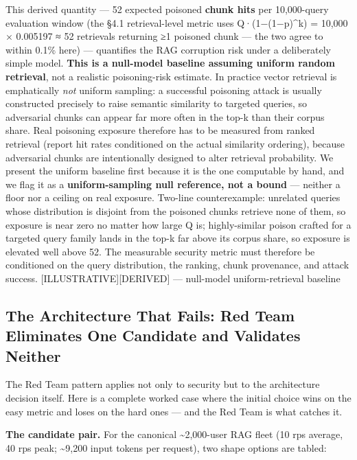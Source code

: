 This derived quantity --- 52 expected poisoned \textbf{chunk hits} per
10,000-query evaluation window (the §4.1 retrieval-level metric uses
Q·(1−(1−p)\^{}k) = 10,000 × 0.005197 ≈ 52 retrievals returning ≥1
poisoned chunk --- the two agree to within 0.1\% here) --- quantifies
the RAG corruption risk under a deliberately simple model. \textbf{This
is a null-model baseline assuming uniform random retrieval}, not a
realistic poisoning-risk estimate. In practice vector retrieval is
emphatically \emph{not} uniform sampling: a successful poisoning attack
is usually constructed precisely to raise semantic similarity to
targeted queries, so adversarial chunks can appear far more often in the
top-k than their corpus share. Real poisoning exposure therefore has to
be measured from ranked retrieval (report hit rates conditioned on the
actual similarity ordering), because adversarial chunks are
intentionally designed to alter retrieval probability. We present the
uniform baseline first because it is the one computable by hand, and we
flag it as a \textbf{uniform-sampling null reference, not a bound} ---
neither a floor nor a ceiling on real exposure. Two-line counterexample:
unrelated queries whose distribution is disjoint from the poisoned
chunks retrieve none of them, so exposure is near zero no matter how
large Q is; highly-similar poison crafted for a targeted query family
lands in the top-k far above its corpus share, so exposure is elevated
well above 52. The measurable security metric must therefore be
conditioned on the query distribution, the ranking, chunk provenance,
and attack success. \mbox{{[}ILLUSTRATIVE{]}}\hspace{0pt}\mbox{{[}DERIVED{]}} --- null-model
uniform-retrieval baseline

\subsection{The Architecture That Fails: Red Team Eliminates One
Candidate and Validates
Neither}\label{the-architecture-that-fails-red-team-eliminates-one-candidate-and-validates-neither}

The Red Team pattern applies not only to security but to the
architecture decision itself. Here is a complete worked case where the
initial choice wins on the easy metric and loses on the hard ones ---
and the Red Team is what catches it.

\textbf{The candidate pair.} For the canonical \textasciitilde2,000-user
RAG fleet (10 rps average, 40 rps peak; \textasciitilde9,200 input
tokens per request), two shape options are tabled:

